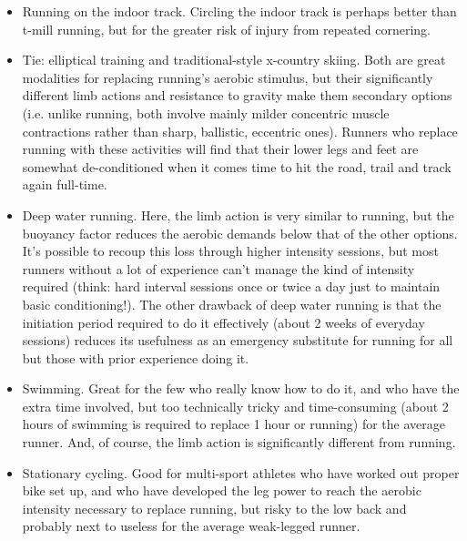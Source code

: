 \begin{enumerate}
\begin{itemize}
            \item Running on the indoor track. Circling the indoor track is perhaps better than t-mill running, but for the greater risk of injury from repeated cornering.

            \item Tie: elliptical training and traditional-style x-country skiing. Both are great modalities for replacing running's aerobic stimulus, but their significantly different limb actions and resistance to gravity make them secondary options (i.e. unlike running, both involve mainly milder concentric muscle contractions rather than sharp, ballistic, eccentric ones). Runners who replace running with these activities will find that their lower legs and feet are somewhat de-conditioned when it comes time to hit the road, trail and track again full-time.

            \item Deep water running. Here, the limb action is very similar to running, but the buoyancy factor reduces the aerobic demands below that of the other options. It's possible to recoup this loss through higher intensity sessions, but most runners without a lot of experience can't manage the kind of intensity required (think: hard interval sessions once or twice a day just to maintain basic conditioning!). The other drawback of deep water running is that the initiation period required to do it effectively (about 2 weeks of everyday sessions) reduces its usefulness as an emergency substitute for running for all but those with prior experience doing it.

            \item Swimming. Great for the few who really know how to do it, and who have the extra time involved, but too technically tricky and time-consuming (about 2 hours of swimming is required to replace 1 hour or running) for the average runner. And, of course, the limb action is significantly different from running.
                
            \item Stationary cycling. Good for multi-sport athletes who have worked out proper bike set up, and who have developed the leg power to reach the aerobic intensity necessary to replace running, but risky to the low back and probably next to useless for the average weak-legged runner.


        \end{itemize}
\end{enumerate}



